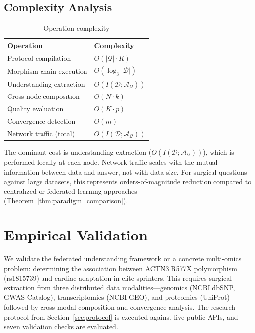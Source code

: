 \documentclass[10pt,twocolumn]{article}
\theoremstyle{definition}
\theoremstyle{remark}
\newcommand{\question}{\mathcal{Q}}
\newcommand{\answer}{\mathcal{A}}
\newcommand{\dataset}{\mathcal{D}}
\begin{document}
\subsection{Complexity Analysis}

\begin{table}[h]
\centering
\caption{Operation complexity}
\begin{tabular}{@{}ll@{}}
\toprule
Operation & Complexity \\
\midrule
Protocol compilation & $O(|\question| \cdot K)$ \\
Morphism chain execution & $O(\log_3 |\dataset|)$ \\
Understanding extraction & $O(I(\dataset; \answer_\question))$ \\
Cross-node composition & $O(N \cdot k)$ \\
Quality evaluation & $O(K \cdot p)$ \\
Convergence detection & $O(m)$ \\
Network traffic (total) & $O(I(\dataset; \answer_\question))$ \\
\bottomrule
\end{tabular}
\end{table}

The dominant cost is understanding extraction ($O(I(\dataset; \answer_\question))$), which is performed locally at each node. Network traffic scales with the mutual information between data and answer, not with data size. For surgical questions against large datasets, this represents orders-of-magnitude reduction compared to centralized or federated learning approaches (Theorem~\ref{thm:paradigm_comparison}).

\section{Empirical Validation}
\label{sec:validation}

We validate the federated understanding framework on a concrete multi-omics problem: determining the association between ACTN3 R577X polymorphism (rs1815739) and cardiac adaptation in elite sprinters. This requires surgical extraction from three distributed data modalities---genomics (NCBI dbSNP, GWAS Catalog), transcriptomics (NCBI GEO), and proteomics (UniProt)---followed by cross-modal composition and convergence analysis. The research protocol from Section~\ref{sec:protocol} is executed against live public APIs, and seven validation checks are evaluated.
\end{document}
